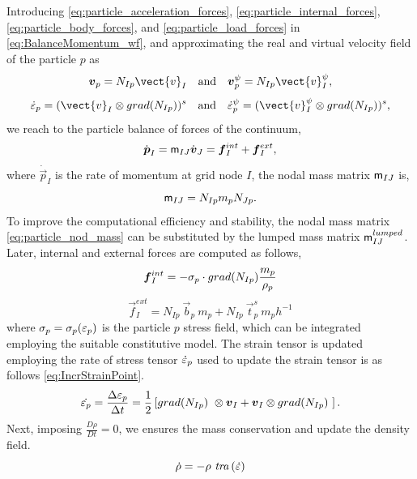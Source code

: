 Introducing \eqref{eq:particle_acceleration_forces},
\eqref{eq:particle_internal_forces}, \eqref{eq:particle_body_forces}, 
and \eqref{eq:particle_load_forces} in \eqref{eq:BalanceMomentum_wf},
and approximating the real and virtual velocity  field of the particle
$p$ as
\begin{equation}
  \label{eq:Approx-velocity-mesh}
  \vec{v}_{p} = N_{Ip} \vect{v}_I
  \quad \text{and} \quad \vec{v}^{\psi}_{p} = N_{Ip} \vect{v}_I^{\psi},
\end{equation}
\begin{equation}
  \label{eq:Approx-gradvelocity-mesh}
  \tens{\dot{\varepsilon}}_p = (\vect{v}_I \otimes \Grad{N_{Ip}})^s
  \quad \text{and} \quad  \tens{\dot{\varepsilon}}_p^{\psi}=
  (\vect{v}_I^{\psi} \otimes \Grad{N_{Ip}})^s ,
\end{equation}
we reach to the particle balance of forces of the continuum,
\begin{equation}
  \label{eq:particle_balance_forces3}
  \dot{\vec{p}}_{I}= \tens{m}_{IJ}\dot{\vec{v}}_{J} = \vec{f}_{I}^{int} + \vec{f}_{I}^{ext},
\end{equation}
where $\dot{\vec{p}}_{I}$ is the rate of momentum at grid node $I$, the nodal mass matrix $\mathsf{m}_{IJ}$ is,
\begin{equation}
  \label{eq:particle_nod_mass}
  \mathsf{m}_{IJ} = N_{Ip} m_p N_{Jp}.
\end{equation}
To improve the computational efficiency and stability, the nodal mass matrix
\eqref{eq:particle_nod_mass} can be substituted by the lumped mass
matrix $\mathsf{m}_{IJ}^{lumped}$.
Later, internal and external forces are computed as follows,
\begin{equation}
  \label{eq:nodal_internal_forces}
  \vec{f}_{I}^{int} = - \tens{\sigma}_{p} \cdot \Grad{N_{Ip}} \frac{m_p}{\rho_p}
\end{equation}
\begin{equation}
  \label{eq:nodal_external_forces}
  \vec{f}_{I}^{ext} = N_{Ip}\ \vec{b}_{p}\ m_p  + N_{Ip}\ \vec{t}^s_{p}\ m_p h^{-1} 
\end{equation}
where $\mathsf{\sigma}_{p} = \mathsf{\sigma}_{p}(\mathsf{\varepsilon}_{p})$
is the particle $p$ stress field, which can be integrated employing
the suitable constitutive model. The strain tensor is updated employing the rate of stress tensor $\dot{ \mathsf{\varepsilon}}_{p}$ used to update the
strain tensor is as follows \eqref{eq:IncrStrainPoint}.
\begin{equation}
  \label{eq:IncrStrainPoint}
  \dot{\tens{\varepsilon}_{p}} = \frac{\Delta
    \tens{\varepsilon}_{p}}{\Delta t} =
  \frac{1}{2} \left[\Grad{N_{Ip}}\ \otimes \vec{v}_{I} + \vec{v}_{I} \otimes
    \Grad{N_{Ip}}\ \right].
\end{equation}
Next, imposing $\frac{D \rho}{D t} = 0$, we ensures the mass
conservation and update the density field.
\begin{equation}
  \label{eq:MassConservation}
\dot{\rho} = - \rho\ \mathit{tra} \left( \dot{\mathsf{\varepsilon}} \right)
\end{equation}

